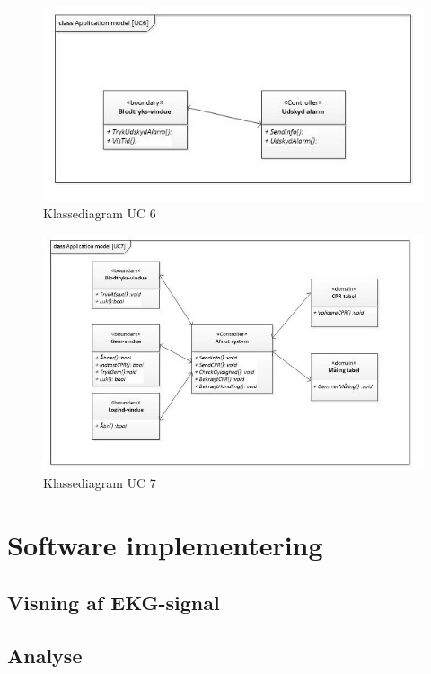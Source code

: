 \begin{figure}[H]
	\centering
	\includegraphics[width=1\textwidth]{Figurer/ISE/classAppModelUC6}
	\caption{Klassediagram UC 6}
	\label{classApp UC6}
\end{figure}

\begin{figure}[H]
	\centering
	\includegraphics[width=1\textwidth]{Figurer/ISE/classAppModelUC7}
	\caption{Klassediagram UC 7}
	\label{classApp UC7}
\end{figure}

\section{Software implementering}
 
\subsection{Visning af EKG-signal}

\subsection{Analyse}

